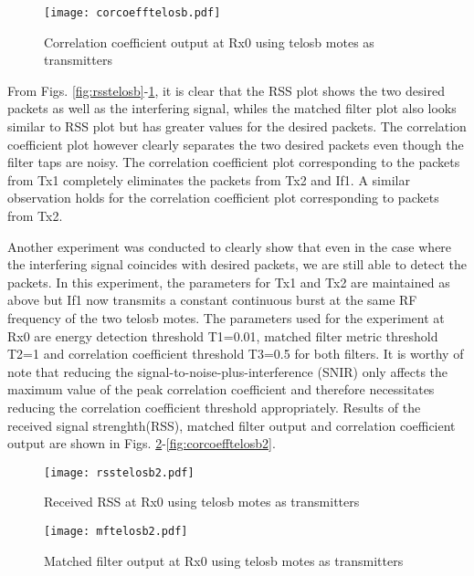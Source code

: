 \documentclass[journal]{IEEEtran}
\begin{document}
\begin{figure}[htb]
\begin{center}
	\texttt{[image: corcoefftelosb.pdf]} 
\caption{Correlation coefficient output at Rx0 using telosb motes as transmitters}
\label{fig:corcoefftelosb}
\end{center}
\end{figure}

From Figs. \ref{fig:rsstelosb}-\ref{fig:corcoefftelosb}, it is clear that the RSS plot shows the two desired packets as well as the interfering signal, whiles the matched filter plot also looks similar to RSS plot but has greater values for the desired packets. The correlation coefficient plot however clearly separates the two desired packets even though the filter taps are noisy. The correlation coefficient plot corresponding to the packets from Tx1 completely eliminates the packets from Tx2 and If1. A similar observation holds for the correlation coefficient plot corresponding to packets from Tx2.

Another experiment was conducted to clearly show that even in the case where the interfering signal coincides with desired packets, we are still able to detect the packets. In this experiment, the parameters for Tx1 and Tx2 are maintained as above but If1 now transmits a constant continuous burst at the same RF frequency of the two telosb motes.  The parameters used for the experiment at Rx0 are energy detection threshold T1=0.01, matched filter metric threshold T2=1 and correlation coefficient threshold T3=0.5 for both filters. It is worthy of note that reducing the signal-to-noise-plus-interference (SNIR) only affects the maximum value of the peak correlation coefficient and therefore necessitates reducing the correlation coefficient threshold appropriately.  Results of the received signal strenghth(RSS), matched filter output and correlation coefficient output are shown in  Figs. \ref{fig:rsstelosb2}-\ref{fig:corcoefftelosb2}.

\begin{figure}[htb]
\begin{center}
	\texttt{[image: rsstelosb2.pdf]} 
\caption{Received RSS at Rx0 using telosb motes as transmitters}
\label{fig:rsstelosb2}
\end{center}
\end{figure}

\begin{figure}[htb]
\begin{center}
	\texttt{[image: mftelosb2.pdf]} 
\caption{Matched filter output at Rx0 using telosb motes as transmitters}
\label{fig:mftelosb2}
\end{center}
\end{figure}
\end{document}

